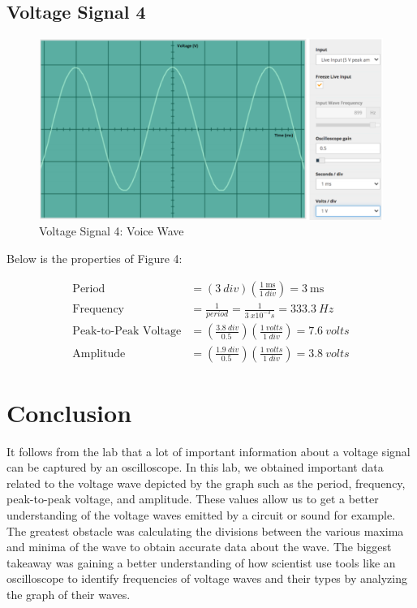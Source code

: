 \documentclass[12pt]{article}
\begin{document}
\subsection{Voltage Signal 4}
\begin{figure}[H]
    \begin{center}
        \includegraphics[scale=0.6]{Figure-4.png}
        \caption { Voltage Signal 4: Voice Wave}
    \end{center}
\end{figure}

\newpage

Below is the properties of Figure 4:

\begin{equation*}
    \begin{split}
        \text{Period} & = (\SI{3}{div})\left(\frac{\SI{1}{\ms}}{\SI{1}{div}}\right) = \SI{3}{\ms} \\
    \text{Frequency} & = \frac{1}{period} =\frac{1}{\SI{3}{x10^{-3} s}} = \SI{333.3}{Hz} \\
        \text{Peak-to-Peak Voltage} & = \left(\frac{\SI{3.8}{div}}{\SI{0.5}{}}\right)\left(\frac{\SI{1}{volts}}{\SI{1}{div}}\right) = \SI{7.6}{volts} \\
        \text{Amplitude} & = \left(\frac{\SI{1.9}{div}}{\SI{0.5}{}}\right)\left(\frac{\SI{1}{volts}}{\SI{1}{div}}\right) = \SI{3.8}{volts} 
    \end{split}
\end{equation*}

\section{Conclusion}
It follows from the lab that a lot of important information about a voltage signal can be captured by an oscilloscope. In this lab, we obtained important data related to the voltage wave depicted by the graph such as the period, frequency, peak-to-peak voltage, and amplitude. These values allow us to get a better understanding of the voltage waves emitted by a circuit or sound for example. The greatest obstacle was calculating the divisions between the various maxima and minima of the wave to obtain accurate data about the wave. The biggest takeaway was gaining a better understanding of how scientist use tools like an oscilloscope to identify frequencies of voltage waves and their types by analyzing the graph of their waves.
\end{document}
